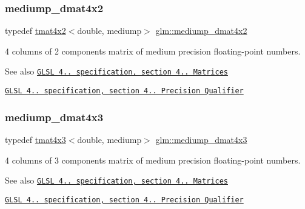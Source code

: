 \subsubsection{\texorpdfstring{mediump\+\_\+dmat4x2}{mediump\_dmat4x2}}
{\footnotesize\ttfamily typedef \hyperlink{structglm_1_1tmat4x2}{tmat4x2}$<$double, mediump$>$ \hyperlink{group__core__precision_gaee918464c0be014e744ff38f37c18585}{glm\+::mediump\+\_\+dmat4x2}}

4 columns of 2 components matrix of medium precision floating-\/point numbers.

\begin{DoxySeeAlso}{See also}
\href{http://www.opengl.org/registry/doc/GLSLangSpec.4.20.8.pdf}{\tt G\+L\+SL 4.. specification, section 4.. Matrices} 

\href{http://www.opengl.org/registry/doc/GLSLangSpec.4.20.8.pdf}{\tt G\+L\+SL 4.. specification, section 4.. Precision Qualifier} 
\end{DoxySeeAlso}
\mbox{\label{group__core__precision_ga9870d3f13ee4601a8abf75f6b54440b9}} 
\subsubsection{\texorpdfstring{mediump\+\_\+dmat4x3}{mediump\_dmat4x3}}
{\footnotesize\ttfamily typedef \hyperlink{structglm_1_1tmat4x3}{tmat4x3}$<$double, mediump$>$ \hyperlink{group__core__precision_ga9870d3f13ee4601a8abf75f6b54440b9}{glm\+::mediump\+\_\+dmat4x3}}

4 columns of 3 components matrix of medium precision floating-\/point numbers.

\begin{DoxySeeAlso}{See also}
\href{http://www.opengl.org/registry/doc/GLSLangSpec.4.20.8.pdf}{\tt G\+L\+SL 4.. specification, section 4.. Matrices} 

\href{http://www.opengl.org/registry/doc/GLSLangSpec.4.20.8.pdf}{\tt G\+L\+SL 4.. specification, section 4.. Precision Qualifier} 
\end{DoxySeeAlso}
\mbox{\label{group__core__precision_ga6dc4057e30931ebd0b5d7e44ef27763a}} 
